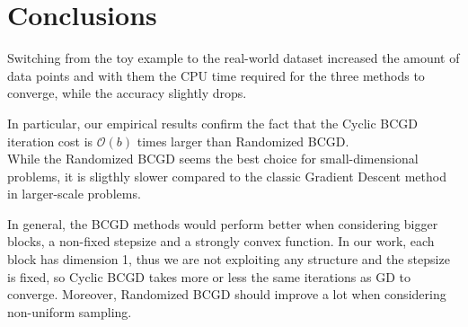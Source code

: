 \documentclass[10pt,twocolumn,letterpaper]{article}
\begin{document}
\section{Conclusions}
Switching from the toy example to the real-world dataset increased the amount of data points and with them the CPU time required for the three methods to converge, while the accuracy slightly drops.

In particular, our empirical results confirm the fact that the Cyclic BCGD  iteration cost is $\mathcal{O}(b)$ times larger than Randomized BCGD.\\

While the Randomized BCGD seems the best choice for small-dimensional problems, it is sligthly slower compared to the classic Gradient Descent method in larger-scale problems.

In general, the BCGD methods would perform better when considering bigger blocks, a non-fixed stepsize and a strongly convex function. In our work, each block has dimension 1, thus we are not exploiting any structure and the stepsize is fixed, so Cyclic BCGD takes more or less the same iterations as GD to converge. Moreover, Randomized BCGD should improve a lot when considering non-uniform sampling.



\end{document}
